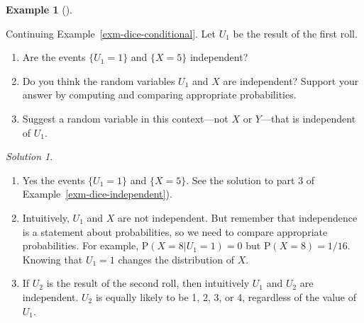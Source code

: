 \documentclass[
  letterpaper,
  DIV=11,
  numbers=noendperiod]{scrreprt}
\providecommand{\tightlist}{%
  \setlength{\itemsep}{0pt}\setlength{\parskip}{0pt}}
\theoremstyle{plain}
\theoremstyle{definition}
\newtheorem{example}{Example}[chapter]
\theoremstyle{definition}
\theoremstyle{definition}
\theoremstyle{remark}
\newtheorem{refsolution}{Solution}[chapter]
\begin{document}
\begin{tcolorbox}[enhanced jigsaw, opacityback=0, left=2mm, colframe=quarto-callout-note-color-frame, toprule=.15mm, breakable, colback=white, leftrule=.75mm, arc=.35mm, rightrule=.15mm, bottomrule=.15mm]

\begin{example}[]\protect\hypertarget{exm-dice-independence-rv}{}\label{exm-dice-independence-rv}

Continuing Example~\ref{exm-dice-conditional}. Let \(U_1\) be the result
of the first roll.

\begin{enumerate}
\def\labelenumi{\arabic{enumi}.}
\tightlist
\item
  Are the events \(\{U_1 = 1\}\) and \(\{X = 5\}\) independent?
\item
  Do you think the random variables \(U_1\) and \(X\) are independent?
  Support your answer by computing and comparing appropriate
  probabilities.
\item
  Suggest a random variable in this context---not \(X\) or \(Y\)---that
  is independent of \(U_1\).
\end{enumerate}

\end{example}

\end{tcolorbox}

\begin{tcolorbox}[enhanced jigsaw, opacityback=0, rightrule=.15mm, coltitle=black, colframe=quarto-callout-tip-color-frame, toprule=.15mm, colbacktitle=quarto-callout-tip-color!10!white, opacitybacktitle=0.6, left=2mm, toptitle=1mm, breakable, title={Solution (click to expand)}, bottomtitle=1mm, colback=white, leftrule=.75mm, titlerule=0mm, arc=.35mm, bottomrule=.15mm]

\begin{refsolution}
\leavevmode

\begin{enumerate}
\def\labelenumi{\arabic{enumi}.}
\tightlist
\item
  Yes the events \(\{U_1 = 1\}\) and \(\{X = 5\}\). See the solution to
  part 3 of Example~\ref{exm-dice-independent}).
\item
  Intuitively, \(U_1\) and \(X\) are not independent. But remember that
  independence is a statement about probabilities, so we need to compare
  appropriate probabilities. For example,
  \(\textrm{P}(X = 8 | U_1 = 1) = 0\) but \(\textrm{P}(X = 8) = 1/16\).
  Knowing that \(U_1=1\) changes the distribution of \(X\).
\item
  If \(U_2\) is the result of the second roll, then intuitively \(U_1\)
  and \(U_2\) are independent. \(U_2\) is equally likely to be 1, 2, 3,
  or 4, regardless of the value of \(U_1\).
\end{enumerate}

\label{sol-dice-independence-rv}

\end{refsolution}

\end{tcolorbox}
\end{document}
